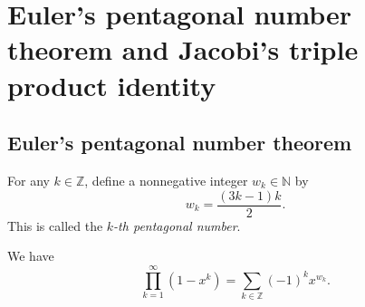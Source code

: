 \section{Euler's pentagonal number theorem and Jacobi's triple product identity}

\subsection{Euler's pentagonal number theorem}

\begin{definition}
\label{def.pars.pent-num}
\leantarget
\leanok
For any $k\in\mathbb{Z}$, define a nonnegative
integer $w_{k}\in\mathbb{N}$ by
\[
w_{k}=\dfrac{\left(  3k-1\right)  k}{2}.
\]
This is called the $k$\emph{-th pentagonal number}.
\end{definition}

\begin{theorem}
\label{thm.pars.pent}
\leantarget
\leanok
We have
\[
\prod_{k=1}^{\infty}\left(  1-x^{k}\right)  =\sum_{k\in\mathbb{Z}}\left(
-1\right)  ^{k}x^{w_{k}}.
\]
\end{theorem}

